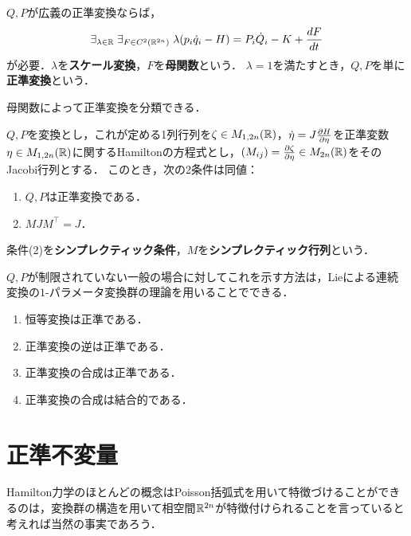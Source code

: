 \documentclass[uplatex, dvipdfmx]{jsreport}
\begin{document}
\begin{lemma}[正準変換の正規化と母関数による定式化]
    $Q,P$が広義の正準変換ならば，
    \[\exists_{\lambda\in\mathbb{R}}\;\exists_{F\in C^2(\mathbb{R}^{2n})}\;\lambda(p_i\dot{q}_i-H)=P_i\dot{Q}_i-K+\frac{d F}{d t}\]
    が必要．$\lambda$を\textbf{スケール変換}，$F$を\textbf{母関数}という．
    $\lambda=1$を満たすとき，$Q,P$を単に\textbf{正準変換}という．
\end{lemma}
\begin{remarks}
    母関数によって正準変換を分類できる．
\end{remarks}

\begin{theorem}[symplecticな定式化]
    $Q,P$を変換とし，これが定める1列行列を$\zeta\in M_{1,2n}(\mathbb{R})$，$\dot{\eta}=J\frac{\partial H}{\partial \eta}$を正準変数$\eta\in M_{1,2n}(\mathbb{R})$に関するHamiltonの方程式とし，$(M_{ij})=\frac{\partial \zeta}{\partial \eta}\in M_{2n}(\mathbb{R})$をそのJacobi行列とする．
    このとき，次の2条件は同値：
    \begin{enumerate}
        \item $Q,P$は正準変換である．
        \item $MJM^\top=J$．
    \end{enumerate}
    条件(2)を\textbf{シンプレクティック条件}，$M$を\textbf{シンプレクティック行列}という．
\end{theorem}
\begin{history}
    $Q,P$が制限されていない一般の場合に対してこれを示す方法は，Lieによる連続変換の$1$-パラメータ変換群の理論を用いることでできる．
\end{history}

\begin{proposition}[正準変換の群]\mbox{}
    \begin{enumerate}
        \item 恒等変換は正準である．
        \item 正準変換の逆は正準である．
        \item 正準変換の合成は正準である．
        \item 正準変換の合成は結合的である．
    \end{enumerate}
\end{proposition}

\section{正準不変量}

\begin{tcolorbox}[colframe=ForestGreen, colback=ForestGreen!10!white,breakable,colbacktitle=ForestGreen!40!white,coltitle=black,fonttitle=\bfseries\sffamily,
title=]
    Hamilton力学のほとんどの概念はPoisson括弧式を用いて特徴づけることができるのは，変換群の構造を用いて相空間$\mathbb{R}^{2n}$が特徴付けられることを言っていると考えれば当然の事実であろう．
\end{tcolorbox}
\end{document}
